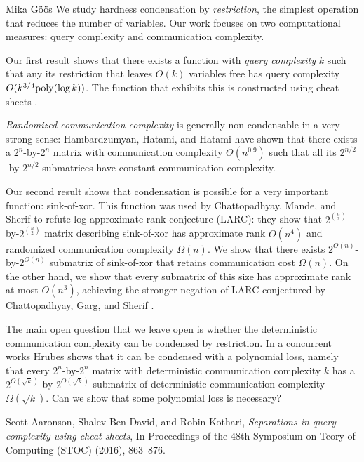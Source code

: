 \documentclass[report]{owrart}
\begin{document}
\begin{report}
\begin{talk}{Mika G\"o\"os}
  We study hardness condensation by \emph{restriction}, the simplest operation that reduces the number of variables. Our work focuses on two computational measures: query complexity and communication complexity. 
  
  Our first result shows that there exists a function with \emph{query complexity} $k$ such that any its restriction that leaves $O(k)$ variables free has query complexity $O(k^{3/4} {\rm poly}(\log k))$. The function that exhibits this is constructed using cheat sheets \cite{Aaronson2016}. 
  
  \emph{Randomized communication complexity} is generally non-condensable in a very strong sense: Hambardzumyan,
  Hatami, and Hatami \cite{Hambardzumyan2022} have shown that there exists a $2^n$-by-$2^n$ matrix with communication complexity $\Theta(n^{0.9})$ such that all its $2^{n/2}$-by-$2^{n/2}$ submatrices have constant communication complexity. 
  
  Our second result shows that condensation is possible for a very important function: sink-of-xor. This function was used by Chattopadhyay, Mande, and Sherif \cite{Chattopadhyay2020} to refute log approximate rank conjecture (LARC): they show that $2^{\binom{n}{2}}$-by-$2^{\binom{n}{2}}$ matrix describing sink-of-xor has approximate rank $O(n^4)$ and randomized communication complexity $\Omega(n)$. We show that there exists $2^{O(n)}$-by-$2^{O(n)}$ submatrix of sink-of-xor that retains communication cost $\Omega(n)$. On the other hand, we show that every submatrix of this size has approximate rank at most $O(n^3)$, achieving the stronger negation of LARC conjectured by Chattopadhyay, Garg, and Sherif \cite{Chattopadhyay2021}.
  
  The main open question that we leave open is whether the deterministic communication complexity can be condensed by restriction. In a concurrent works Hrubes \cite{Hrubes2024} shows that it can be condensed with a polynomial loss, namely that every $2^n$-by-$2^n$ matrix with deterministic communication complexity $k$ has a $2^{O(\sqrt{k})}$-by-$2^{O(\sqrt{k})}$ submatrix of deterministic communication complexity $\Omega(\sqrt{k})$. Can we show that some polynomial loss is necessary? 
  
  
  \begin{thebibliography}{99}
  
  Scott Aaronson, Shalev Ben-David, and Robin Kothari, \textit{Separations in query complexity using cheat sheets}, In Proceedings of the 48th Symposium on Teory of Computing (STOC) (2016), 863--876.
  

\end{thebibliography}
\end{talk}
\end{report}
\end{document}
